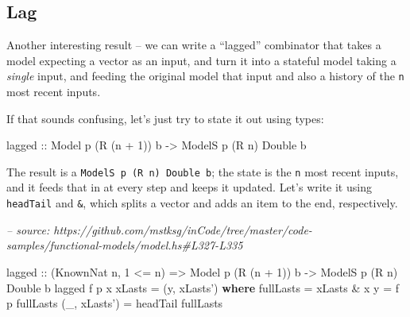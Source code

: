 \documentclass[]{article}
\newenvironment{Shaded}{}{}
\newcommand{\CommentTok}[1]{\textcolor[rgb]{0.38,0.63,0.69}{\textit{#1}}}
\newcommand{\DataTypeTok}[1]{\textcolor[rgb]{0.56,0.13,0.00}{#1}}
\newcommand{\DecValTok}[1]{\textcolor[rgb]{0.25,0.63,0.44}{#1}}
\newcommand{\FunctionTok}[1]{\textcolor[rgb]{0.02,0.16,0.49}{#1}}
\newcommand{\KeywordTok}[1]{\textcolor[rgb]{0.00,0.44,0.13}{\textbf{#1}}}
\newcommand{\NormalTok}[1]{#1}
\newcommand{\OtherTok}[1]{\textcolor[rgb]{0.00,0.44,0.13}{#1}}
\begin{document}
\hypertarget{lag}{%
\subsection{Lag}\label{lag}}

Another interesting result -- we can write a ``lagged'' combinator that takes a
model expecting a vector as an input, and turn it into a stateful model taking a
\emph{single} input, and feeding the original model that input and also a
history of the \texttt{n} most recent inputs.

If that sounds confusing, let's just try to state it out using types:

\begin{Shaded}
\begin{Highlighting}[]
\OtherTok{lagged ::} \DataTypeTok{Model}\NormalTok{  p       (}\DataTypeTok{R}\NormalTok{ (n }\FunctionTok{+} \DecValTok{1}\NormalTok{)) b}
       \OtherTok{->} \DataTypeTok{ModelS}\NormalTok{ p (}\DataTypeTok{R}\NormalTok{ n) }\DataTypeTok{Double}\NormalTok{      b}
\end{Highlighting}
\end{Shaded}

The result is a \texttt{ModelS\ p\ (R\ n)\ Double\ b}; the state is the
\texttt{n} most recent inputs, and it feeds that in at every step and keeps it
updated. Let's write it using \texttt{headTail} and \texttt{\&}, which splits a
vector and adds an item to the end, respectively.

\begin{Shaded}
\begin{Highlighting}[]
\CommentTok{-- source: https://github.com/mstksg/inCode/tree/master/code-samples/functional-models/model.hs#L327-L335}

\NormalTok{lagged}
\OtherTok{    ::}\NormalTok{ (}\DataTypeTok{KnownNat}\NormalTok{ n, }\DecValTok{1} \FunctionTok{<=}\NormalTok{ n)}
    \OtherTok{=>} \DataTypeTok{Model}\NormalTok{  p       (}\DataTypeTok{R}\NormalTok{ (n }\FunctionTok{+} \DecValTok{1}\NormalTok{)) b}
    \OtherTok{->} \DataTypeTok{ModelS}\NormalTok{ p (}\DataTypeTok{R}\NormalTok{ n) }\DataTypeTok{Double}\NormalTok{      b}
\NormalTok{lagged f p x xLasts }\FunctionTok{=}\NormalTok{ (y, xLasts')}
  \KeywordTok{where}
\NormalTok{    fullLasts    }\FunctionTok{=}\NormalTok{ xLasts }\FunctionTok{&}\NormalTok{ x}
\NormalTok{    y            }\FunctionTok{=}\NormalTok{ f p fullLasts}
\NormalTok{    (_, xLasts') }\FunctionTok{=}\NormalTok{ headTail fullLasts}
\end{Highlighting}
\end{Shaded}
\end{document}
